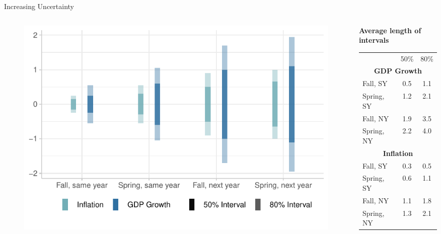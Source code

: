 \documentclass[en]{sdqbeamer}
\begin{document}
\begin{frame}{Increasing Uncertainty}
\begin{columns}
\begin{column}{0.6\textwidth}
    \begin{figure}
        \centering
        \includegraphics[width=\textwidth]{figures/horizon_uncc_new.pdf}
        \label{fig:enter-label}
    \end{figure}
\end{column}
\begin{column}{0.4\textwidth}
\centering
\textbf{Average length of intervals}
\begin{table}
\begin{tabular}{ l c c }
&   50\%  & 80\%\\[0.3em]
\multicolumn{3}{c}{\textbf{GDP Growth}}\\
Fall,  SY & 0.5 & 1.1\\ 
Spring, SY &1.2 &2.1 \\ 
Fall, NY & 1.9 & 3.5\\ 
Spring, NY &2.2 &4.0 \\[0.3em] 
\multicolumn{3}{c}{\textbf{Inflation}}\\
Fall,  SY & 0.3 & 0.5\\ 
Spring, SY &0.6 &1.1 \\ 
Fall, NY & 1.1 & 1.8\\ 
Spring, NY &1.3 &2.1 \\ 
\end{tabular}
\end{table}
\vspace{1.25cm}
\end{column}
\end{columns}


\end{frame}
\end{document}
